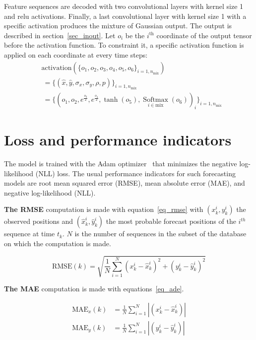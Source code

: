 \documentclass[a4paper, 10pt, conference]{ieeeconf}      %
\begin{document}
Feature sequences are decoded with two convolutional layers with kernel size 1 and relu activations.
Finally, a last convolutional layer with kernel size 1 with a specific activation produces
the mixture of Gaussian output.
The output is described in section~\ref{sec_inout}.
Let $o_i$ be the $i^{\text{th}}$ coordinate of the output tensor before the activation function.
To constraint it, a specific activation function is applied on each coordinate at every time steps:
\begin{equation*}
    \begin{split}
        &\text{activation}(\{o_1, o_2, o_3, o_4, o_5, o_6\}_{i=1,n_{\text{mix}}})\\
        &~=\{(\hat{x}, \hat{y}, \sigma_x, \sigma_y, \rho, p)\}_{i=1,n_{\text{mix}}}\\
        &~=\Big\{(o_1, o_2, e^{\frac{o_3}{2}}, e^{\frac{o_4}{2}}, \operatorname{tanh}(o_5), \underset{i \in \text{mix}}{\operatorname{Softmax}}(o_6))_i\Big\}_{i=1,n_{\text{mix}}}
    \end{split}
\end{equation*}

\section{Loss and performance indicators}
\label{sec_loss}

The model is trained with the Adam optimizer~\cite{Kingma2015} that minimizes the negative log-likelihood (NLL) loss.
The usual performance indicators for such forecasting models are root mean squared error (RMSE),
mean absolute error (MAE), and negative log-likelihood (NLL).

\textbf{The RMSE} computation is made with equation~\eqref{eq_rmse} with $(x_k^i, y_k^i)$ the observed positions and
$(\hat{x}_k^i, \hat{y}_k^i)$ the most probable forecast positions of the $i^{th}$ sequence at time $t_k$.
$N$ is the number of sequences in the subset of the database on which the computation is made.

\begin{equation}
    \text{RMSE}(k) = \sqrt{\frac{1}{N}\sum_{i=1}^N{(x_k^i - \hat{x}_k^i)^2 + (y_k^i - \hat{y}_k^i)^2}}
    \label{eq_rmse}
\end{equation}

\textbf{The MAE} computation is made with equations~\eqref{eq_ade}.

\begin{equation}
    \begin{split}
        \text{MAE}_x(k) &=\frac{1}{N}\sum_{i=1}^N{|(x_k^i - \hat{x}_k^i)|}\\
        \text{MAE}_y(k) &=\frac{1}{N}\sum_{i=1}^N{|(y_k^i - \hat{y}_k^i)|}
    \end{split}
    \label{eq_ade}
\end{equation}
\end{document}
